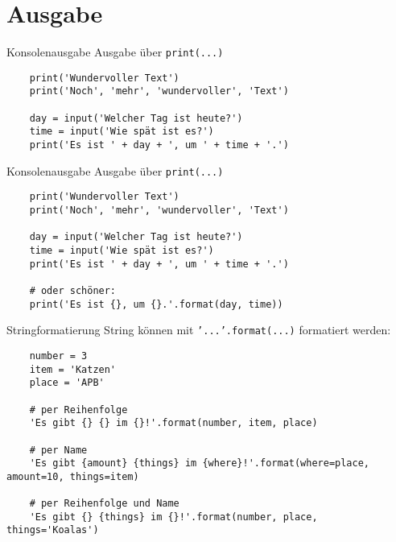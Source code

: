 \section{Ausgabe}

\begin{frame}[fragile]{Konsolenausgabe}
	Ausgabe über \texttt{print(...)}

	\begin{lstlisting}
	print('Wundervoller Text')
	print('Noch', 'mehr', 'wundervoller', 'Text')

	day = input('Welcher Tag ist heute?')
	time = input('Wie spät ist es?')
	print('Es ist ' + day + ', um ' + time + '.')
	\end{lstlisting}
\end{frame}

\begin{frame}[fragile]{Konsolenausgabe}
	Ausgabe über \texttt{print(...)}

	\begin{lstlisting}
	print('Wundervoller Text')
	print('Noch', 'mehr', 'wundervoller', 'Text')

	day = input('Welcher Tag ist heute?')
	time = input('Wie spät ist es?')
	print('Es ist ' + day + ', um ' + time + '.')

	# oder schöner:
	print('Es ist {}, um {}.'.format(day, time))
	\end{lstlisting}
\end{frame}

\begin{frame}[fragile]{Stringformatierung}
	String können mit \texttt{'...'.format(...)} formatiert werden:

	\begin{lstlisting}
	number = 3
	item = 'Katzen'
	place = 'APB'

	# per Reihenfolge
	'Es gibt {} {} im {}!'.format(number, item, place)

	# per Name
	'Es gibt {amount} {things} im {where}!'.format(where=place, amount=10, things=item)

	# per Reihenfolge und Name
	'Es gibt {} {things} im {}!'.format(number, place, things='Koalas')
	\end{lstlisting}
\end{frame}


